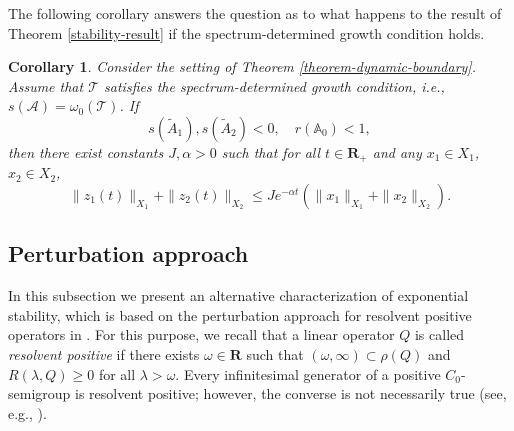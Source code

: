 \documentclass[a4paper,11pt,reqno]{amsart}
\def\A{{\mathbb{A}}}
\def\calT{{\mathcal{T}}}
\def\calA{{\mathcal{A}}}
\def\R{\mathbf{R}}
\theoremstyle{plain}
\newtheorem{corollary}{Corollary}[section]
\numberwithin{equation}{section}
\begin{document}
The following corollary answers the question as to what happens to the result of Theorem \ref{stability-result} if the spectrum-determined growth condition holds.
\begin{corollary}\label{Cor2}
Consider the setting of Theorem \ref{theorem-dynamic-boundary}. Assume that $\calT$ satisfies the spectrum-determined growth condition, i.e., $s(\calA)=\omega_0(\calT)$. If 
\begin{equation*}\label{spectral-condition}
s(\tilde{A}_1),s(\tilde{A}_2)<0,\quad r(\A_0)<1,
\end{equation*}
then there exist constants $J, \alpha>0$ such that for all $t\in\R_+$ and any $x_1\in X_1$, $x_2\in X_2$,
\begin{equation*}
\| z_1(t)\|_{X_1}+\| z_2(t)\|_{X_2}\le J e^{-\alpha t}\left(\| x_1\|_{X_1}+\| x_2\|_{X_2}\right).
\end{equation*}
\end{corollary}

\subsection{Perturbation approach}

In this subsection we present an alternative characterization of exponential stability, which is based on the perturbation approach for resolvent positive operators in \cite{MR4711370}. For this purpose, we recall that a linear operator $Q$ is called \textit{resolvent positive} if there exists $\omega \in \R$ such that $(\omega, \infty) \subset \rho(Q)$ and $R(\lambda,Q) \ge 0$ for all $\lambda > \omega$. Every infinitesimal generator of a positive $C_0$-semigroup is resolvent positive; however, the converse is not necessarily true (see, e.g., \cite[Section 3]{MR872810}).
\end{document}
